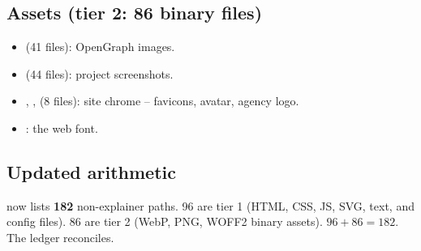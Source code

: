 \documentclass[11pt,a4paper]{article}
\begin{document}
\subsection*{Assets (tier 2: 86 binary files)}

\begin{itemize}
  \item {} (41 files): OpenGraph images.
  \item {} (44 files): project screenshots.
  \item {}, ,  (8 files):
    site chrome -- favicons, avatar, agency logo.
  \item {}: the web font.
\end{itemize}

\subsection*{Updated arithmetic}

 now lists \textbf{182} non-explainer paths.
96 are tier 1 (HTML, CSS, JS, SVG, text, and config files).
86 are tier 2 (WebP, PNG, WOFF2 binary assets).
$96 + 86 = 182$. The ledger reconciles.
\end{document}

